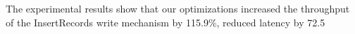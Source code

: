 \begin{abstract*}
The experimental results show that our optimizations increased the throughput of the InsertRecords write mechanism by 115.9\%, reduced latency by 72.5%

\end{abstract*}
